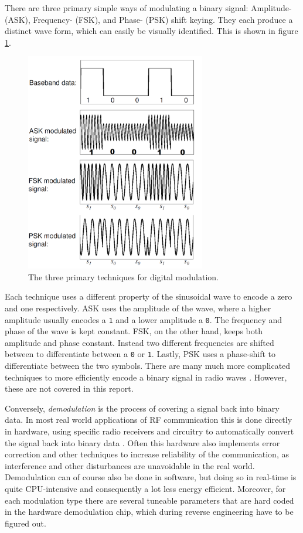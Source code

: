 There are three primary simple ways of modulating a binary signal: Amplitude- (ASK), Frequency- (FSK), and Phase- (PSK) shift keying. They each produce a distinct wave form, which can easily be visually identified. This is shown in figure \ref{fig:digital-modulation}.
\begin{figure}[!ht]
    \centering
    \includegraphics[width=0.7\textwidth]{images/6-pentesting/digital-modulation.png}
    \caption{The three primary techniques for digital modulation.}
    \label{fig:digital-modulation}
\end{figure}
Each technique uses a different property of the sinusoidal wave to encode a zero and one respectively. \gls{ASK} uses the amplitude of the wave, where a higher amplitude usually encodes a \texttt{1} and a lower amplitude a \texttt{0}. The frequency and phase of the wave is kept constant. \gls{FSK}, on the other hand, keeps both amplitude and phase constant. Instead two different frequencies are shifted between to differentiate between a \texttt{0} or \texttt{1}. Lastly, \gls{PSK} uses a phase-shift to differentiate between the two symbols. There are many much more complicated techniques to more efficiently encode a binary signal in radio waves \cite{rf-modulation}. However, these are not covered in this report.

Conversely, \textit{demodulation} is the process of covering a signal back into binary data. In most real world applications of RF communication this is done directly in hardware, using specific radio receivers and circuitry to automatically convert the signal back into binary data \cite{rf-modulation}. Often this hardware also implements error correction and other techniques to increase reliability of the communication, as interference and other disturbances are unavoidable in the real world. Demodulation can of course also be done in software, but doing so in real-time is quite CPU-intensive and consequently a lot less energy efficient. Moreover, for each modulation type there are several tuneable parameters that are hard coded in the hardware demodulation chip, which during reverse engineering have to be figured out.

